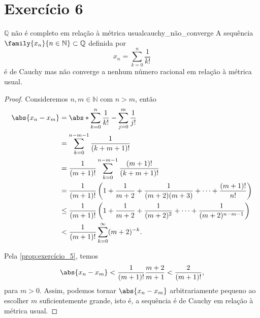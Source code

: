 \section*{Exercício 6}
\begin{proposition}{\(\mathbb{Q}\) não é completo em relação à métrica usual}{cauchy_não_converge}
    A sequência \(\family{x_n}{n\in \mathbb{N}}\subset \mathbb{Q}\) definida por
    \begin{equation*}
        x_n = \sum_{k = 0}^n \frac{1}{k!}
    \end{equation*}
    é de Cauchy mas não converge a nenhum número racional em relação à métrica usual.
\end{proposition}
\begin{proof}
    Consideremos \(n,m \in \mathbb{N}\) com \(n > m\), então
    \begin{align*}
        \abs{x_n - x_m} &= \abs*{\sum_{k=0}^{n}\frac{1}{k!} - \sum_{j = 0}^m\frac{1}{j!}}\\
                        &= \sum_{k=0}^{n-m-1} \frac{1}{(k+m+1)!}\\
                        &= \frac{1}{(m+1)!} \sum_{k=0}^{n-m-1} \frac{(m+1)!}{(k+m+1)!}\\
                        &= \frac{1}{(m+1)!} \left(1 + \frac{1}{m+2} + \frac{1}{(m+2)(m+3)} + \dots + \frac{(m+1)!}{n!}\right)\\
                        &\leq \frac{1}{(m+1)!}\left(1 + \frac{1}{m+2} + \frac{1}{(m+2)^2} + \dots + \frac{1}{(m+2)^{n-m-1}}\right)\\
                        &<\frac{1}{(m+1)!} \sum_{k = 0}^\infty (m+2)^{-k}.
    \end{align*}

    Pela \cref{prop:exercício_5}, temos
    \begin{equation*}
        \abs{x_n - x_m} < \frac{1}{(m+1)!}\frac{m + 2}{m + 1} < \frac{2}{(m+1)!},
    \end{equation*}
    para \(m > 0\). Assim, podemos tornar \(\abs{x_n - x_m}\) arbitrariamente pequeno ao escolher \(m\) suficientemente grande, isto é, a sequência é de Cauchy em relação à métrica usual.


\end{proof}

